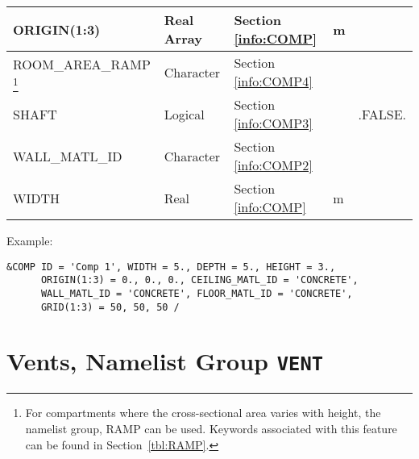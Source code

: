 \begin{minipage}{6.5in}
\begin{longtable}{|l|l|l|l|l@{\extracolsep{\fill}}|}
{\ct ORIGIN(1:3)}           & Real Array     & Section \ref{info:COMP}                 & m         &                 \\ \hline
{\ct ROOM\_AREA\_RAMP}
\footnote{For compartments where the cross-sectional area varies with height, the namelist group, {\ct RAMP} can be used. Keywords associated with this feature can be found in Section~\ref{tbl:RAMP}.}  
                            & Character & Section \ref{info:COMP4}                 &           &                 \\ \hline
{\ct SHAFT}                 & Logical   & Section \ref{info:COMP3}                 &           & {\ct .FALSE.}   \\ \hline
{\ct WALL\_MATL\_ID}        & Character & Section \ref{info:COMP2}                 &           &                 \\ \hline
{\ct WIDTH}                 & Real      & Section \ref{info:COMP}     & m         &                 \\ \hline
\end{longtable}
\end{minipage}

\vspace{\baselineskip}
\noindent Example:
\begin{lstlisting}
&COMP ID = 'Comp 1', WIDTH = 5., DEPTH = 5., HEIGHT = 3., 
      ORIGIN(1:3) = 0., 0., 0., CEILING_MATL_ID = 'CONCRETE', 
      WALL_MATL_ID = 'CONCRETE', FLOOR_MATL_ID = 'CONCRETE',
      GRID(1:3) = 50, 50, 50 /
\end{lstlisting}




\clearpage
\section{Vents, Namelist Group \texorpdfstring{{\tt VENT}}{VENT}}

